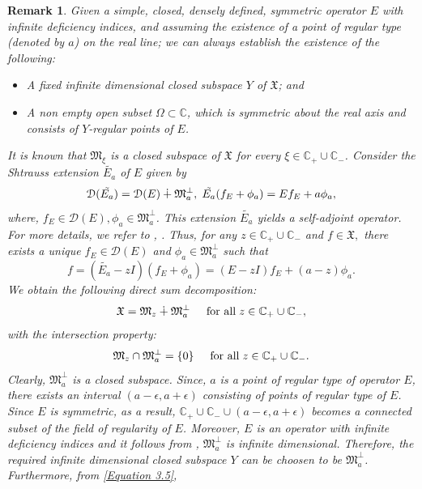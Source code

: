 \documentclass [12pt,reqno]{amsart}
\numberwithin{equation}{subsection}
\newtheorem{rmk}[thm]{Remark}
\numberwithin{equation}{section}
\begin{document}
\begin{rmk}\label{Remark 3.2}
Given a simple, closed, densely defined, symmetric operator $E$ with infinite deficiency indices, and assuming the existence of a point of regular type (denoted by $a$) on the real line; we can always establish the existence of the following: 
\begin{itemize}
\item A fixed infinite dimensional closed subspace $Y$ of $\mathfrak{X}$; and 
\item A non empty open subset $\Omega \subset \mathbb{C}$, which is symmetric about the real axis and consists of $Y$-regular points of $E$.
\end{itemize}
It is known that \(\mathfrak{M}_\xi\) is a closed subspace of \(\mathfrak{X}\) for every \(\xi \in \mathbb{C}_+ \cup \mathbb{C}_-\). 
 Consider the Shtrauss extension $\tilde{E_a}$ of $E$ given by \begin{equation}\linebreak
\mathcal{D}(\tilde{E_a})= \mathcal{D}(E) \dotplus \mathfrak{M}_a^{\perp}, \hspace{0.1cm} \tilde{E_a}(f_E+ \phi_a)=Ef_E+a\phi_a,
\end{equation}where, $ f_E \in \mathcal{D}(E), \phi_a \in \mathfrak{M}_a^{\perp}$.
This extension $\tilde{E_a}$ yields a self-adjoint operator. For more details, we refer to \cite{straus}, \cite{arlinski}. Thus, for any $z \in  \mathbb{C}_+ \cup \mathbb{C_-}$ and $f \in \mathfrak{X},$ there exists a unique $f_E \in \mathcal{D}(E)$ and $\phi_a \in \mathfrak{M}_a^{\perp}$ such that \begin{equation}
f=(\tilde{E_a}-zI)(f_E+\phi_a)= (E-zI)f_E+(a-z)\phi_a.
\end{equation}
We obtain the following direct sum decomposition: \begin{equation} \label{Equation 3.5}
\mathfrak{X}= \mathfrak{M}_z \dotplus \mathfrak{M}_a^{\perp}\hspace{0.5cm} \text{for all} \hspace{0.1cm} z \in \mathbb{C}_+ \cup \mathbb{C_-},
\end{equation}
with the intersection property: \begin{equation}
\mathfrak{M}_z \cap \mathfrak{M}_a^{\perp}= \{ 0 \} \hspace{0.5cm} \text{for all} \hspace{0.1cm} z \in \mathbb{C}_+ \cup \mathbb{C_-}.
\end{equation}
Clearly, $\mathfrak{M}_a^{\perp}$ is a closed subspace. Since, $a$ is a point of regular type of operator $E$, there exists an interval $(a- \epsilon, a+ \epsilon)$ consisting of points of regular type of $E$. Since $E$ is symmetric, as a result, $\mathbb{C}_+ \cup \mathbb{C_-} \cup (a- \epsilon, a+ \epsilon)$ becomes a connected subset of the field of regularity of $E$. Moreover, $E$ is an operator with infinite deficiency indices and it follows from  \cite[Section 78]{Akhiezer}, $\mathfrak{M}_a^{\perp}$ is infinite dimensional. Therefore, the required infinite dimensional closed subspace $Y$ can be choosen to be $\mathfrak{M}_a^{\perp}$. Furthermore, from \eqref{Equation 3.5}, \begin{equation} \label{Equation 3.7}

\end{equation}
\end{rmk}
\end{document}
